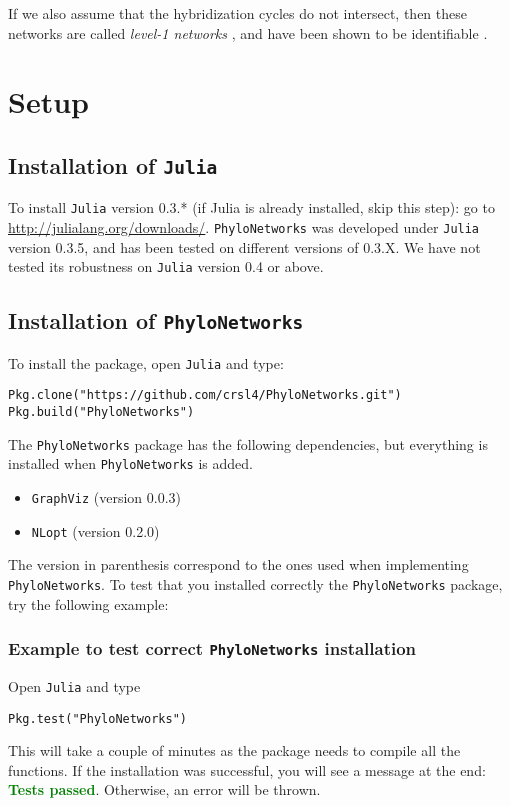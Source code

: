\documentclass[12pt]{article}
\newcommand{\falta}[1]{\textcolor{red}{#1}}
\begin{document}
If we also assume that the hybridization cycles do not intersect, then
these networks are called \textit{level-1 networks} \citep{Huson2010},
and have been shown to be identifiable
\citep{Pardi2015,Solis-Lemus2015}.


\section{Setup}
\subsection{Installation of \texttt{Julia}}
To install \texttt{Julia} version 0.3.* (if Julia is already installed, skip
this step): go to \url{http://julialang.org/downloads/}.
\texttt{PhyloNetworks} was developed under \texttt{Julia}
version 0.3.5, and has been tested on different versions of 0.3.X.
We have not tested its robustness on \texttt{Julia} version 0.4 or above.

\subsection{Installation of \texttt{PhyloNetworks}}
To install the package, %
open
\texttt{Julia} and type:
\begin{lstlisting}
Pkg.clone("https://github.com/crsl4/PhyloNetworks.git")
Pkg.build("PhyloNetworks")
\end{lstlisting}

The \texttt{PhyloNetworks} package has the following dependencies, but everything is installed when
\texttt{PhyloNetworks} is added.
\begin{itemize}
\item \texttt{GraphViz} (version 0.0.3)
\item \texttt{NLopt} (version 0.2.0)
\end{itemize}
The version in parenthesis correspond to the ones used when
implementing \texttt{PhyloNetworks}.
To test that you installed correctly the \texttt{PhyloNetworks} package, try the following example:

\subsubsection{Example to test correct \texttt{PhyloNetworks} installation}
Open \texttt{Julia} and type
\begin{lstlisting}
Pkg.test("PhyloNetworks")
\end{lstlisting}
This will take a couple of
minutes as the package needs to compile all the functions. If the
installation was successful, you will see a message at the end:
\textcolor{green}{\textbf{Tests passed}}. Otherwise, an error will be thrown.
\end{document}
